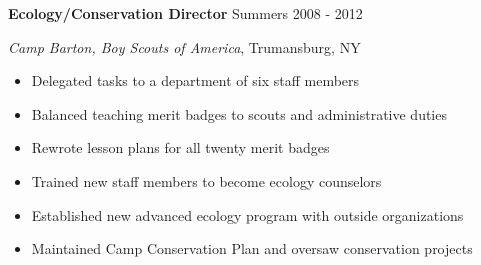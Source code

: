 
\vspace{7pt}

\textbf{Ecology/Conservation Director} \hfill Summers 2008 - 2012

\textit{Camp Barton, Boy Scouts of America}, Trumansburg, NY

\begin{itemize}
    \item Delegated tasks to a department of six staff members
    \item Balanced teaching merit badges to scouts and administrative duties
    \item Rewrote lesson plans for all twenty merit badges
    \item Trained new staff members to become ecology counselors
    \item Established new advanced ecology program with outside organizations
    \item Maintained Camp Conservation Plan and oversaw conservation projects
\end{itemize}
